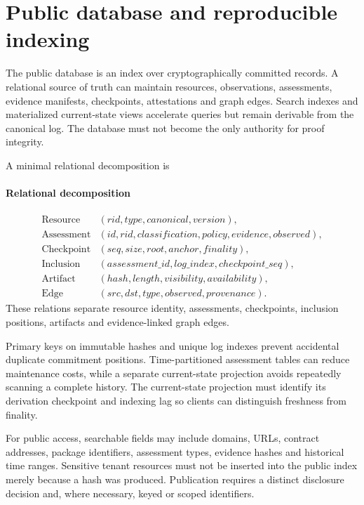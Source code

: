 \documentclass[10pt,a4paper]{article}
\begin{document}
\section*{Public database and reproducible indexing}
The public database is an index over cryptographically committed records. A relational source of truth can maintain resources, observations, assessments, evidence manifests, checkpoints, attestations and graph edges. Search indexes and materialized current-state views accelerate queries but remain derivable from the canonical log. The database must not become the only authority for proof integrity.


A minimal relational decomposition is


\paragraph{Relational decomposition}
\[\begin{aligned}\mathrm{Resource}&(rid,type,canonical,version),\\\mathrm{Assessment}&(id,rid,classification,policy,evidence,observed),\\\mathrm{Checkpoint}&(seq,size,root,anchor,finality),\\\mathrm{Inclusion}&(assessment\_id,log\_index,checkpoint\_seq),\\\mathrm{Artifact}&(hash,length,visibility,availability),\\\mathrm{Edge}&(src,dst,type,observed,provenance).\end{aligned}\]
These relations separate resource identity, assessments, checkpoints, inclusion positions, artifacts and evidence-linked graph edges.


Primary keys on immutable hashes and unique log indexes prevent accidental duplicate commitment positions. Time-partitioned assessment tables can reduce maintenance costs, while a separate current-state projection avoids repeatedly scanning a complete history. The current-state projection must identify its derivation checkpoint and indexing lag so clients can distinguish freshness from finality.


For public access, searchable fields may include domains, URLs, contract addresses, package identifiers, assessment types, evidence hashes and historical time ranges. Sensitive tenant resources must not be inserted into the public index merely because a hash was produced. Publication requires a distinct disclosure decision and, where necessary, keyed or scoped identifiers.
\end{document}
